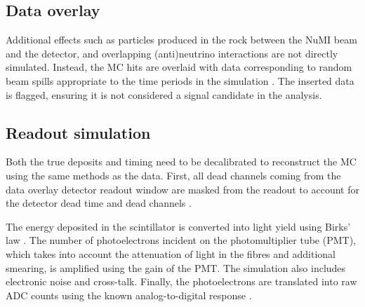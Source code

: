 



\subsection{Data overlay}
Additional effects such as particles produced in the rock between the NuMI beam and the detector, and overlapping (anti)neutrino interactions are not directly simulated. Instead, the MC hits are overlaid with data corresponding to random beam spills appropriate to the time periods in the simulation \cite{dataOverlay,TiceThesis2014}. The inserted data is flagged, ensuring it is not considered a signal candidate in the analysis.


\subsection{Readout simulation}

Both the true deposits and timing need to be decalibrated to reconstruct the MC using the same methods as the data. First, all dead channels coming from the data overlay detector readout window are masked from the readout to account for the detector dead time and dead channels \cite{MarshallThesis2016}. 


The energy deposited in the scintillator is converted into light yield using Birks' law \cite{Birks:1951boa}. The number of photoelectrons incident on the photomultiplier tube (PMT), which takes into account the attenuation of light in the fibres and additional smearing, is amplified using the gain of the PMT. The simulation also includes electronic noise and cross-talk. Finally, the photoelectrons are translated into raw ADC counts using the known analog-to-digital response \cite{WolcottThesis2015}.

